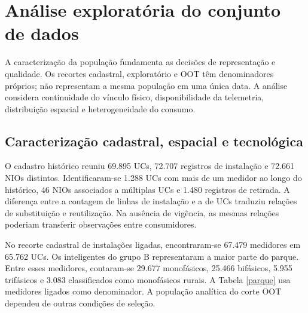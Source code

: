 \chapter{Análise exploratória do conjunto de dados}\label{anuxe1lise-exploratuxf3ria-do-conjunto-de-dados}
A caracterização da população fundamenta as decisões de representação e qualidade. Os recortes cadastral, exploratório e OOT têm denominadores próprios; não representam a mesma população em uma única data. A análise considera continuidade do vínculo físico, disponibilidade da telemetria, distribuição espacial e heterogeneidade do consumo.
\section{Caracterização cadastral, espacial e tecnológica}
O cadastro histórico reuniu 69.895 UCs, 72.707 registros de instalação e 72.661 NIOs distintos. Identificaram-se 1.288 UCs com mais de um medidor ao longo do histórico, 46 NIOs associados a múltiplas UCs e 1.480 registros de retirada. A diferença entre a contagem de linhas de instalação e a de UCs traduziu relações de substituição e reutilização. Na ausência de vigência, as mesmas relações poderiam transferir observações entre consumidores.

No recorte cadastral de instalações ligadas, encontraram-se 67.479 medidores em 65.762 UCs. Os inteligentes do grupo B representaram a maior parte do parque. Entre esses medidores, contaram-se 29.677 monofásicos, 25.466 bifásicos, 5.955 trifásicos e 3.083 classificados como monofásicos rurais. A Tabela \ref{parque} usa medidores ligados como denominador. A população analítica do corte OOT dependeu de outras condições de seleção.


